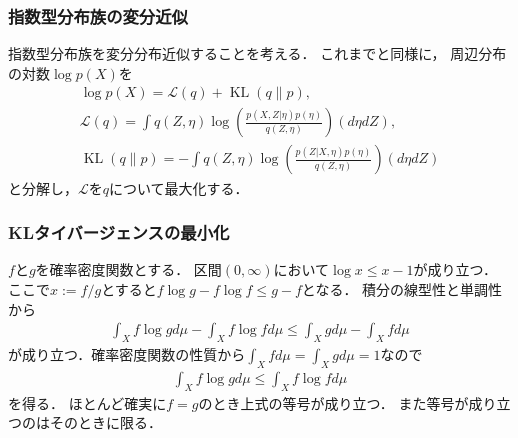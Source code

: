 \documentclass[10pt,hyperref={unicode}]{beamer}
\DeclareMathOperator*{\KL}{KL}
\newcommand{\parentheses}[1]{\left(#1\right)}
\newcommand{\braces}[1]{\left\{#1\right\}}
\newcommand{\brackets}[1]{\left[#1\right]}
\newcommand{\energy}{\mathcal{L}}
\begin{document}
\begin{frame}
\frametitle{指数型分布族の変分近似}
指数型分布族を変分分布近似することを考える．
これまでと同様に，
周辺分布の対数$\log p\parentheses{X}$を
\begin{gather*}
    \log p\parentheses{X} = \energy\parentheses{q} + \KL\parentheses{q\|p}, \\
    \energy\parentheses{q} = \int q\parentheses{Z,\eta}
    \log \parentheses{\frac{p\parentheses{X,Z |\eta}p\parentheses{\eta}}{q\parentheses{Z,\eta}}} \parentheses{d{\eta}dZ}, \\
    \KL\parentheses{q \| p} = - \int q\parentheses{Z,\eta}
    \log \parentheses{\frac{p\parentheses{Z|X, \eta}p\parentheses{\eta}}{q\parentheses{Z,\eta}}} \parentheses{d{\eta}dZ}
\end{gather*}
と分解し，$\energy$を$q$について最大化する．
\end{frame}

\begin{frame}
\frametitle{KLタイバージェンスの最小化}
$f$と$g$を確率密度関数とする．
区間$\parentheses{0,\infty}$において$\log x \leq x - 1$が成り立つ．
ここで$x := f/g$とすると$f \log g - f \log f \leq g - f$となる．
積分の線型性と単調性から
\begin{align*}
    \int_X f \log g d\mu - \int_X f \log f d\mu \leq \int_X g d\mu - \int_X f d\mu
\end{align*}
が成り立つ．確率密度関数の性質から$\int_X f d\mu = \int_X g d\mu = 1$なので
\begin{align*}
    \int_X f \log g d\mu \leq \int_X f \log f d\mu
\end{align*}
を得る．
ほとんど確実に$f = g$のとき上式の等号が成り立つ．
また等号が成り立つのはそのときに限る．\nocite{bogachev2007measure}
\end{frame}

\end{document}
